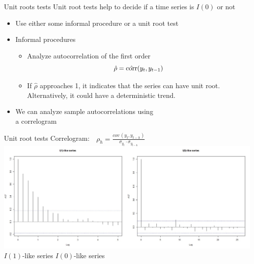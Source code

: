 \documentclass{beamer}
\begin{document}
\begin{frame}{Unit roots tests}
Unit root tests help to decide if a time series is $I(0)$ or not
\vspace{0.4cm}
\begin{itemize}
\item Use either some informal procedure or a unit root test
\vspace{0.4cm}
\item Informal procedures
\begin{itemize}
\item Analyze autocorrelation of the first order
$$\hat{\rho}=\hat{\textnormal{corr}}(y_t,y_{t-1})$$
\item If $\hat{\rho}$ approaches 1, it indicates that the series can have unit root. Alternatively, it could have a deterministic trend.
\end{itemize}
\item We can analyze sample autocorrelations using \\a correlogram
\end{itemize}
\end{frame}
\begin{frame}{Unit root tests}
Correlogram:  
$\, \, \, \, \rho_h = \frac{\textit{cov} \, (y_t, y_{t-h})}{\sigma_{y_t} \cdot \sigma_{y_{t-h}}}$
\includegraphics[width=1\textwidth]{img/corelogramWeek2.jpg}
\hspace{1.5cm} $I(1)$-like series \hspace{3 cm} $I(0)$-like series
\end{frame}
\end{document}
